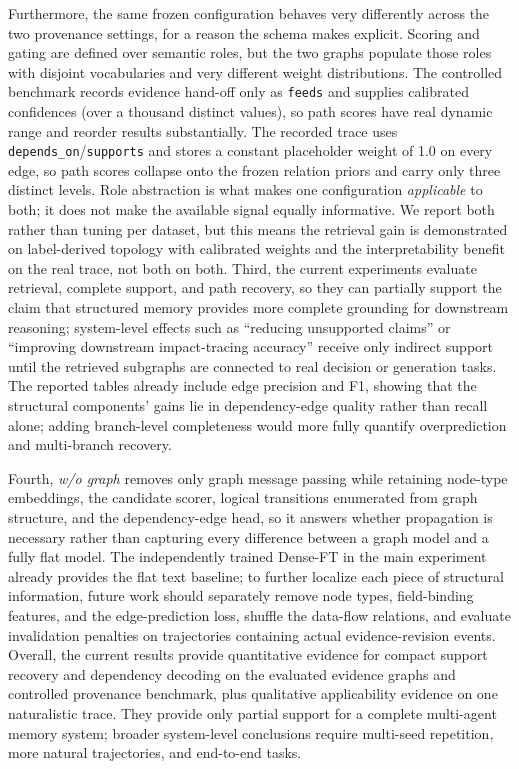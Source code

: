 Furthermore, the same frozen configuration behaves very differently across
the two provenance settings, for a reason the schema makes explicit. Scoring
and gating are defined over semantic roles, but the two graphs populate those
roles with disjoint vocabularies and very different weight distributions. The
controlled benchmark records evidence hand-off only as \texttt{feeds} and
supplies calibrated confidences (over a thousand distinct values), so path
scores have real dynamic range and reorder results substantially. The recorded
trace uses \texttt{depends\_on}/\texttt{supports} and stores a constant
placeholder weight of 1.0 on every edge, so path scores collapse onto the
frozen relation priors and carry only three distinct levels. Role abstraction
is what makes one configuration \emph{applicable} to both; it does not make
the available signal equally informative. We report both rather than tuning
per dataset, but this means the retrieval gain is demonstrated on
label-derived topology with calibrated weights and the interpretability
benefit on the real trace, not both on both.
Third, the current experiments
evaluate retrieval, complete support, and path recovery, so they can
partially support the claim that structured memory provides more complete
grounding for downstream reasoning; system-level effects such as ``reducing
unsupported claims'' or ``improving downstream impact-tracing accuracy''
receive only indirect support until the retrieved subgraphs are connected
to real decision or generation tasks. The reported tables already include edge
precision and F1, showing that the structural components' gains lie in
dependency-edge quality rather than recall alone; adding branch-level
completeness would more fully quantify overprediction and multi-branch
recovery.

Fourth, \emph{w/o graph} removes only graph message passing while
retaining node-type embeddings, the candidate scorer, logical transitions
enumerated from graph structure, and the dependency-edge head, so it
answers whether propagation is necessary rather than capturing every
difference between a graph model and a fully flat model. The independently
trained Dense-FT in the main experiment already provides the flat text
baseline; to further localize each piece of structural information, future
work should separately remove node types, field-binding features, and the
edge-prediction loss, shuffle the data-flow relations, and evaluate
invalidation penalties on trajectories containing actual evidence-revision
events. Overall, the current results provide quantitative evidence for
compact support recovery and dependency decoding on the evaluated evidence
graphs and controlled provenance benchmark, plus qualitative applicability
evidence on
one naturalistic trace. They provide only partial support for a complete
multi-agent memory system; broader system-level conclusions require
multi-seed repetition, more natural trajectories, and end-to-end tasks.

